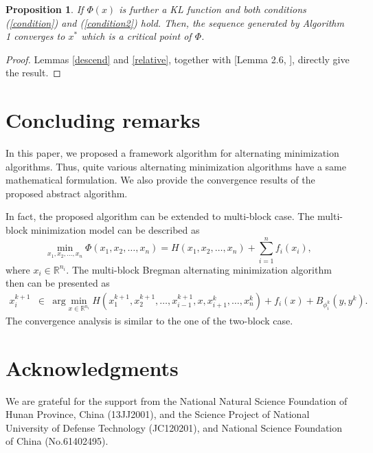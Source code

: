 \documentclass[12pt]{article}
\newtheorem{proposition}{Proposition}
\newtheorem{proof}{Proof}
\begin{document}
\begin{proposition}
If $\Phi(x)$ is further a KL function and both conditions (\ref{condition}) and (\ref{condition2}) hold. Then, the sequence generated by Algorithm 1 converges to $x^*$ which is a critical point of $\Phi$.
\end{proposition}
\begin{proof}
Lemmas \ref{descend} and \ref{relative}, together with [Lemma 2.6, \cite{attouch2013convergence}], directly give the result.
\end{proof}
\section{Concluding remarks}
In this paper, we proposed a framework algorithm for alternating minimization algorithms. Thus, quite various alternating minimization algorithms have a same mathematical formulation. We also provide the convergence results of the proposed abstract algorithm.

In fact, the proposed algorithm can be extended to multi-block case.  The multi-block minimization model can be described as
 \begin{equation}\label{model2}
    \min_{x_1,x_2,\ldots,x_n} \Phi(x_1,x_2,\ldots,x_n)=H(x_1,x_2,\ldots,x_n)+\sum_{i=1}^n f_i(x_i),
\end{equation}
where $x_i\in \mathbb{R}^{n_i}$. The  multi-block Bregman alternating minimization algorithm then can be presented as
 \begin{eqnarray}\label{scheme2}
x_i^{k+1}&\in& \textrm{arg}\min_{x\in \mathbb{R}^{n_i}} H(x_1^{k+1},x_2^{k+1},\ldots,x_{i-1}^{k+1},x,x_{i+1}^k,\ldots,x_n^k)+f_i(x)+B_{\phi_i^k}(y,y^k).
\end{eqnarray}
The convergence analysis is similar to the one of the two-block case.
\section*{Acknowledgments}
We are grateful for the support from the National Natural Science Foundation of Hunan Province, China (13JJ2001), and the Science Project of National University
of Defense Technology (JC120201), and National Science Foundation of China (No.61402495).
\end{document}
